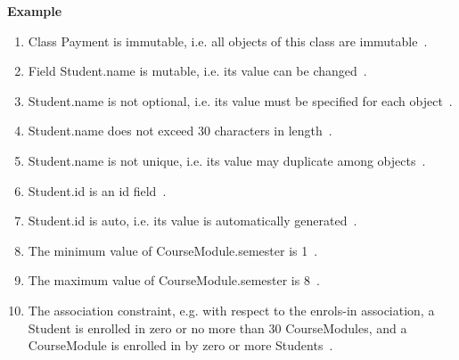 	\noindent\textbf{Example}
	\begin{enumerate}
		\item Class Payment is immutable, i.e. all objects of this class are immutable~.
		\item Field Student.name is mutable, i.e. its value can be changed~.
		\item Student.name is not optional, i.e. its value must be specified for each object~.
		\item Student.name does not exceed 30 characters in length~.
		\item Student.name is not unique, i.e. its value may duplicate among objects~.
		\item Student.id is an id field~.
		\item Student.id is auto, i.e. its value is automatically generated~.
		\item The minimum value of CourseModule.semester is 1~.
		\item The maximum value of CourseModule.semester is 8~.
		\item The association constraint, e.g. with respect to the enrols-in association, a Student is enrolled in zero or no more than 30 CourseModules,
		and a CourseModule is enrolled in by zero or more Students~.
	\end{enumerate}
